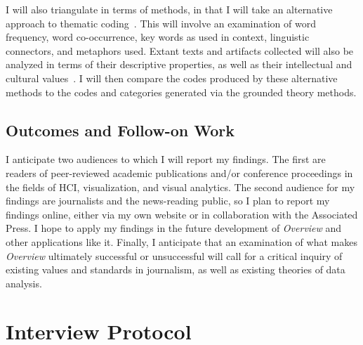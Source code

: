 I will also triangulate in terms of methods, in that I will take an alternative approach to thematic coding~\cite{Ryan2003}. 
This will involve an examination of word frequency, word co-occurrence, key words as used in context, linguistic connectors, and metaphors used. 
Extant texts and artifacts collected will also be analyzed in terms of their descriptive properties, as well as their intellectual and cultural values~\cite{Prown1982}. 
I will then compare the codes produced by these alternative methods to the codes and categories generated via the grounded theory methods.

\subsection{Outcomes and Follow-on Work}
\label{app:overview:proposal-outcomes}

I anticipate two audiences to which I will report my findings. 
The first are readers of peer-reviewed academic publications and/or conference proceedings in the fields of \ac{HCI}, visualization, and visual analytics. 
The second audience for my findings are journalists and the news-reading public, so I plan to report my findings online, either via my own website or in collaboration with the Associated Press.
I hope to apply my findings in the future development of {\it Overview} and other
applications like it. 
Finally, I anticipate that an examination of what makes {\it Overview}
ultimately successful or unsuccessful will call for a critical inquiry of existing values and standards in journalism, as well as existing theories of data analysis.


\section{Interview Protocol}
\label{app:overview:interview-protocol}


